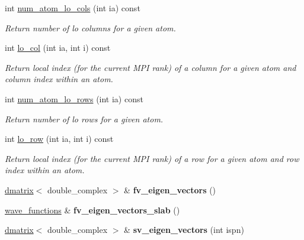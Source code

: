 \begin{DoxyCompactItemize}
\item 
int \hyperlink{classsirius_1_1_k__point_a9f2adf5a1e4ad095b6947f5e4de36f1e}{num\+\_\+atom\+\_\+lo\+\_\+cols} (int ia) const 
\begin{DoxyCompactList}\small\item\em Return number of lo columns for a given atom. \end{DoxyCompactList}\item 
int \hyperlink{classsirius_1_1_k__point_a51e21e08366f7e900c1993f6e380f8d2}{lo\+\_\+col} (int ia, int i) const 
\begin{DoxyCompactList}\small\item\em Return local index (for the current M\+P\+I rank) of a column for a given atom and column index within an atom. \end{DoxyCompactList}\item 
int \hyperlink{classsirius_1_1_k__point_ac0b0b2f513c6e834bf2ff18b5c8df1ab}{num\+\_\+atom\+\_\+lo\+\_\+rows} (int ia) const 
\begin{DoxyCompactList}\small\item\em Return number of lo rows for a given atom. \end{DoxyCompactList}\item 
int \hyperlink{classsirius_1_1_k__point_a26fe92a8fcccef0432cc2f57d3dbfc52}{lo\+\_\+row} (int ia, int i) const 
\begin{DoxyCompactList}\small\item\em Return local index (for the current M\+P\+I rank) of a row for a given atom and row index within an atom. \end{DoxyCompactList}\item 
\hypertarget{classsirius_1_1_k__point_a1728909cb2cfe62adbbfa55c9bbe87f3}{}\hyperlink{classsddk_1_1dmatrix}{dmatrix}$<$ double\+\_\+complex $>$ \& {\bfseries fv\+\_\+eigen\+\_\+vectors} ()\label{classsirius_1_1_k__point_a1728909cb2cfe62adbbfa55c9bbe87f3}

\item 
\hypertarget{classsirius_1_1_k__point_a2300400850bc3ff315f959ed0d2cc384}{}\hyperlink{classsddk_1_1wave__functions}{wave\+\_\+functions} \& {\bfseries fv\+\_\+eigen\+\_\+vectors\+\_\+slab} ()\label{classsirius_1_1_k__point_a2300400850bc3ff315f959ed0d2cc384}

\item 
\hypertarget{classsirius_1_1_k__point_a76132dd0ee3da3e0b7d9c69815dee9b8}{}\hyperlink{classsddk_1_1dmatrix}{dmatrix}$<$ double\+\_\+complex $>$ \& {\bfseries sv\+\_\+eigen\+\_\+vectors} (int ispn)\label{classsirius_1_1_k__point_a76132dd0ee3da3e0b7d9c69815dee9b8}


\end{DoxyCompactItemize}
